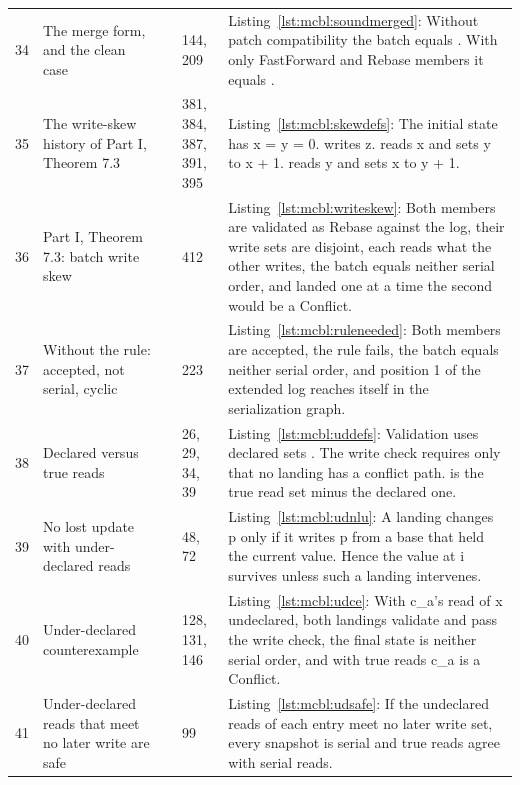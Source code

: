 \documentclass[11pt,letterpaper]{article}
\theoremstyle{definition}
\theoremstyle{remark}
\begin{document}
\begin{small}
\begin{longtable}{@{}L{0.8cm}L{3.4cm}L{3.6cm}L{1.3cm}L{5.4cm}@{}}
34 & The merge form, and the clean case &  & 144, 209 & Listing~\ref{lst:mcbl:soundmerged}: Without patch compatibility the batch equals . With only FastForward and Rebase members it equals . \\
35 & The write-skew history of Part I, Theorem 7.3 &  & 381, 384, 387, 391, 395 & Listing~\ref{lst:mcbl:skewdefs}: The initial state has x = y = 0.  writes z.  reads x and sets y to x + 1.  reads y and sets x to y + 1. \\
36 & Part I, Theorem 7.3: batch write skew &  & 412 & Listing~\ref{lst:mcbl:writeskew}: Both members are validated as Rebase against the log, their write sets are disjoint, each reads what the other writes, the batch equals neither serial order, and landed one at a time the second would be a Conflict. \\
37 & Without the rule: accepted, not serial, cyclic &  & 223 & Listing~\ref{lst:mcbl:ruleneeded}: Both members are accepted, the rule fails, the batch equals neither serial order, and position 1 of the extended log reaches itself in the serialization graph. \\
38 & Declared versus true reads &  & 26, 29, 34, 39 & Listing~\ref{lst:mcbl:uddefs}: Validation uses declared sets . The write check requires only that no landing has a conflict path.  is the true read set minus the declared one. \\
39 & No lost update with under-declared reads &  & 48, 72 & Listing~\ref{lst:mcbl:udnlu}: A landing changes p only if it writes p from a base that held the current value. Hence the value at i survives unless such a landing intervenes. \\
40 & Under-declared counterexample &  & 128, 131, 146 & Listing~\ref{lst:mcbl:udce}: With c\_a's read of x undeclared, both landings validate and pass the write check, the final state is neither serial order, and with true reads c\_a is a Conflict. \\
41 & Under-declared reads that meet no later write are safe &  & 99 & Listing~\ref{lst:mcbl:udsafe}: If the undeclared reads of each entry meet no later write set, every snapshot is serial and true reads agree with serial reads. \\

\end{longtable}
\end{small}
\end{document}
